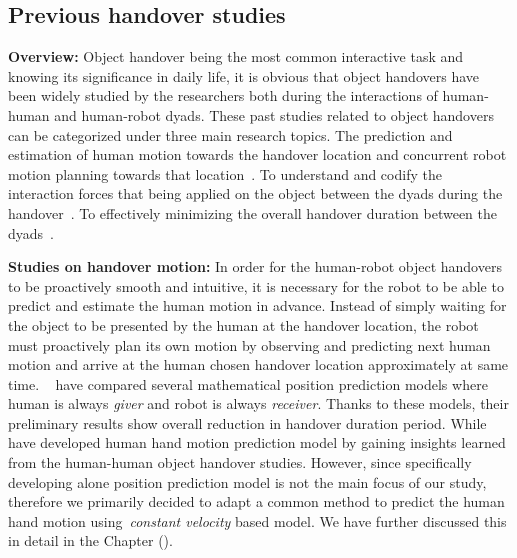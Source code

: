 \subsection{Previous handover studies}

\textbf{Overview:} Object handover being the most common interactive task and knowing its significance in daily life, it is obvious that object handovers have been widely studied by the researchers both during the interactions of human-human and human-robot dyads. These past studies related to object handovers can be categorized under three main research topics. The prediction and estimation of human motion towards the handover location and concurrent robot motion planning towards that location~\cite{huber2008Indus, li2015predicting, waldhart2015planning, mainprice2012sharing, vahrenkamp2009humanoid, kim2004advanced, mainprice2010planning}. To understand and codify the interaction forces that being applied on the object between the dyads during the handover~\cite{chan2014implementation, medina2016human, chan2013human, sadigh2009safe, nagata1998delivery}. To effectively minimizing the overall handover duration between the dyads~\cite{nemlekarprompt, cakmak2011using, huber2008human, nemlekar2019object}.

\textbf{Studies on handover motion:} In order for the human-robot object handovers to be proactively smooth and intuitive, it is necessary for the robot to be able to predict and estimate the human motion in advance. Instead of simply waiting for the object to be presented by the human at the handover location, the robot must proactively plan its own motion by observing and predicting next human motion and arrive at the human chosen handover location approximately at same time. ~\cite{li2015predicting} have compared several mathematical position prediction models where human is always \textit{giver} and robot is always \textit{receiver}. Thanks to these models, their preliminary results show overall reduction in handover duration period. While~\cite{perez2015fast, sheikholeslami2018prediction, vogt2017system, kupcsik2016learning}  have developed human hand motion prediction model by gaining insights learned from the human-human object handover studies. However, since specifically developing alone position prediction model is not the main focus of our study, therefore we primarily decided to adapt a common method to predict the human hand motion using~\textit{constant velocity} based model. We have further discussed this in detail in the Chapter ().

